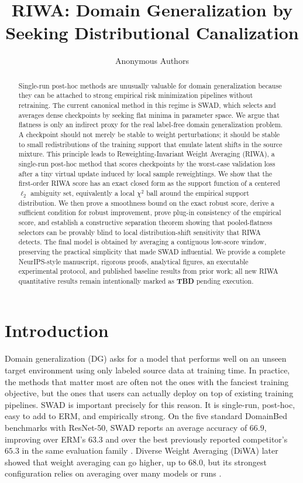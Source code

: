 \documentclass{article}
\title{RIWA: Domain Generalization by Seeking Distributional Canalization}
\author{Anonymous Authors}
\newcommand{\TBD}{\textbf{TBD}}
\newcommand{\riwa}{\textup{\textsc{RIWA}}}
\newcommand{\swad}{\textup{\textsc{SWAD}}}
\begin{document}
\maketitle

\begin{abstract}
Single-run post-hoc methods are unusually valuable for domain generalization because they can be attached to strong empirical risk minimization pipelines without retraining. The current canonical method in this regime is \swad, which selects and averages dense checkpoints by seeking flat minima in parameter space. We argue that flatness is only an indirect proxy for the real label-free domain generalization problem. A checkpoint should not merely be stable to weight perturbations; it should be stable to small redistributions of the training support that emulate latent shifts in the source mixture. This principle leads to Reweighting-Invariant Weight Averaging (\riwa), a single-run post-hoc method that scores checkpoints by the worst-case validation loss after a tiny virtual update induced by local sample reweightings. We show that the first-order \riwa{} score has an exact closed form as the support function of a centered $\ell_2$ ambiguity set, equivalently a local $\chi^2$ ball around the empirical support distribution. We then prove a smoothness bound on the exact robust score, derive a sufficient condition for robust improvement, prove plug-in consistency of the empirical score, and establish a constructive separation theorem showing that pooled-flatness selectors can be provably blind to local distribution-shift sensitivity that \riwa{} detects. The final model is obtained by averaging a contiguous low-score window, preserving the practical simplicity that made \swad{} influential. We provide a complete NeurIPS-style manuscript, rigorous proofs, analytical figures, an executable experimental protocol, and published baseline results from prior work; all new \riwa{} quantitative results remain intentionally marked as \TBD{} pending execution.
\end{abstract}

\section{Introduction}

Domain generalization (DG) asks for a model that performs well on an unseen target environment using only labeled source data at training time. In practice, the methods that matter most are often not the ones with the fanciest training objective, but the ones that users can actually deploy on top of existing training pipelines. \swad{} \citep{cha2021wad} is important precisely for this reason. It is single-run, post-hoc, easy to add to ERM, and empirically strong. On the five standard DomainBed benchmarks with ResNet-50, \swad{} reports an average accuracy of $66.9$, improving over ERM's $63.3$ and over the best previously reported competitor's $65.3$ in the same evaluation family \citep{cha2021wad}. Diverse Weight Averaging (DiWA) later showed that weight averaging can go higher, up to $68.0$, but its strongest configuration relies on averaging over many models or runs \citep{rame2022diwa}.
\end{document}
